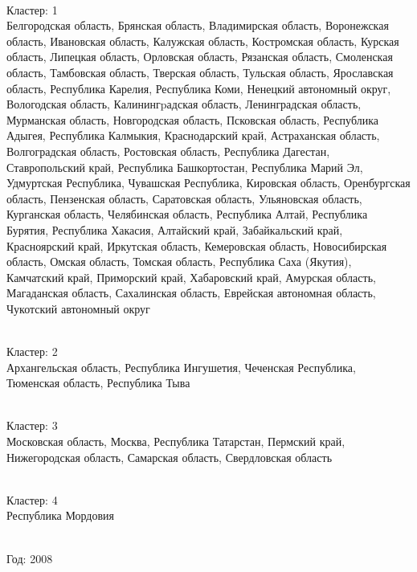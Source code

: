 \documentclass[11pt]{article}
\begin{document}
\newline \\ Кластер:  1
\\ Белгородская область, Брянская область, Владимирская область, Воронежская область, Ивановская область, Калужская область, Костромская область, Курская область, Липецкая область, Орловская область, Рязанская область, Смоленская область, Тамбовская область, Тверская область, Тульская область, Ярославская область, Республика Карелия, Республика Коми, Ненецкий автономный округ, Вологодская область, Калинингpадская область, Ленинградская область, Мурманская область, Новгородская область, Псковская область, Республика Адыгея, Республика Калмыкия, Краснодарский край, Астраханская область, Волгоградская область, Ростовская область, Республика Дагестан, Ставропольский край, Республика Башкортостан, Республика Марий Эл, Удмуртская Республика, Чувашская Республика, Кировская область, Оренбургская область, Пензенская область, Саратовская область, Ульяновская область, Курганская область, Челябинская область, Республика Алтай, Республика Бурятия, Республика Хакасия, Алтайский край, Забайкальский край, Красноярский край, Иркутская область, Кемеровская область, Новосибирская область, Омская область, Томская область, Республика Саха (Якутия), Камчатский край, Приморский край, Хабаровский край, Амурская область, Магаданская область, Сахалинская область, Еврейская автономная область, Чукотский автономный округ

\newline \\ Кластер:  2
\\ Архангельская область, Республика Ингушетия, Чеченская Республика, Тюменская область, Республика Тыва

\newline \\ Кластер:  3
\\ Московская область, Москва, Республика Татарстан, Пермский край, Нижегородская область, Самарская область, Свердловская область

\newline \\ Кластер:  4
\\ Республика Мордовия


\newline \newline \\ Год:  2008
\end{document}
